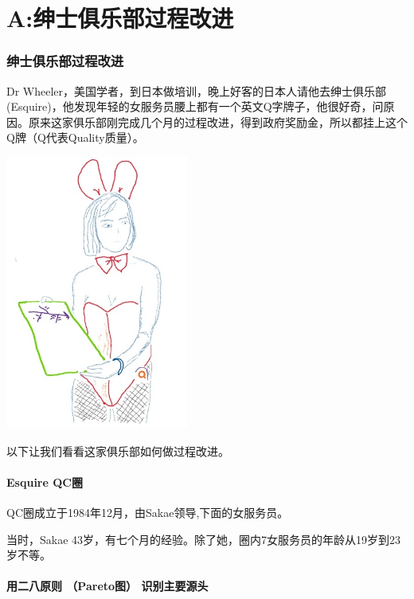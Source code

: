 \chapter{A:绅士俱乐部过程改进} %

\hypertarget{ux7ec5ux58ebux4ff1ux4e50ux90e8ux8fc7ux7a0bux6539ux8fdb}{%
\subsection{绅士俱乐部过程改进}\label{ux7ec5ux58ebux4ff1ux4e50ux90e8ux8fc7ux7a0bux6539ux8fdb}}

Dr
Wheeler，美国学者，到日本做培训，晚上好客的日本人请他去绅士俱乐部(Esquire)，他发现年轻的女服务员腰上都有一个英文Q字牌子，他很好奇，问原因。原来这家俱乐部刚完成几个月的过程改进，得到政府奖励金，所以都挂上这个Q牌（Q代表Quality质量）。


\includegraphics[width=6cm]{Esquire2Screenshot2023-10-271322091.jpg}

以下让我们看看这家俱乐部如何做过程改进。

\hypertarget{esquire-qcux5708}{%
\subsubsection{Esquire QC圈}\label{esquire-qcux5708}}

QC圈成立于1984年12月，由Sakae领导,下面的女服务员。

当时，Sakae
43岁，有七个月的经验。除了她，圈内7女服务员的年龄从19岁到23岁不等。

\hypertarget{ux7528ux4e8cux516bux539fux5219-paretoux56fe-ux8bc6ux522bux4e3bux8981ux6e90ux5934}{%
\subsubsection{用二八原则 （Pareto图）
识别主要源头}\label{ux7528ux4e8cux516bux539fux5219-paretoux56fe-ux8bc6ux522bux4e3bux8981ux6e90ux5934}}

